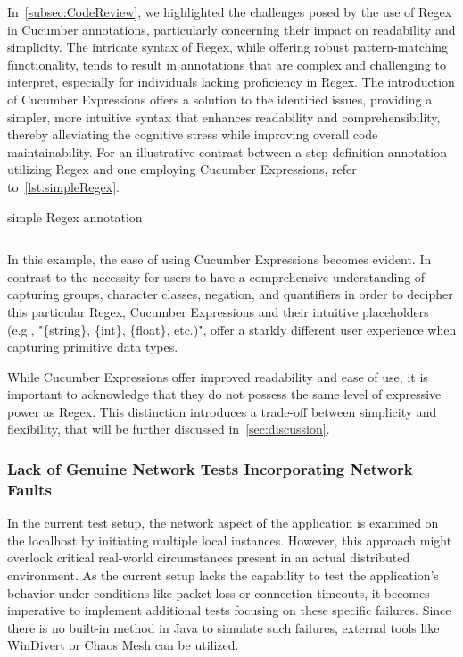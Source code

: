 In~\cref{subsec:CodeReview}, we highlighted the challenges posed by the use of \ac{Regex} in Cucumber annotations, particularly concerning their impact on readability and simplicity. The intricate syntax of \ac{Regex}, while offering robust pattern-matching functionality, tends to result in annotations that are complex and challenging to interpret, especially for individuals lacking proficiency in \ac{Regex}. The introduction of Cucumber Expressions offers a solution to the identified issues, providing a simpler, more intuitive syntax that enhances readability and comprehensibility, thereby alleviating the cognitive stress while improving overall code maintainability. For an illustrative contrast between a step-definition annotation utilizing \ac{Regex} and one employing Cucumber Expressions, refer to~\cref{lst:simpleRegex}.

\begin{listing}[!ht]
\caption{simple \ac{Regex} annotation}
\label{lst:simpleRegex}
\inputminted{java}{files/code/simpleRegex.java}
\end{listing}

In this example, the ease of using Cucumber Expressions becomes evident. In contrast to the necessity for users to have a comprehensive understanding of capturing groups, character classes, negation, and quantifiers in order to decipher this particular \ac{Regex}, Cucumber Expressions and their intuitive placeholders (e.g., "\{string\}, \{int\}, \{float\}, etc.)", offer a starkly different user experience when capturing primitive data types.

While Cucumber Expressions offer improved readability and ease of use, it is important to acknowledge that they do not possess the same level of expressive power as \ac{Regex}. This distinction introduces a trade-off between simplicity and flexibility, that will be further discussed in~\cref{sec:discussion}.


\subsubsection{Lack of Genuine Network Tests Incorporating Network Faults}
\label{sub:lack-network-tests}

In the current test setup, the network aspect of the application is examined on the localhost by initiating multiple local instances. However, this approach might overlook critical real-world circumstances present in an actual distributed environment. As the current setup lacks the capability to test the application's behavior under conditions like packet loss or connection timeouts, it becomes imperative to implement additional tests focusing on these specific failures. Since there is no built-in method in Java to simulate such failures, external tools like WinDivert or Chaos Mesh can be utilized.

